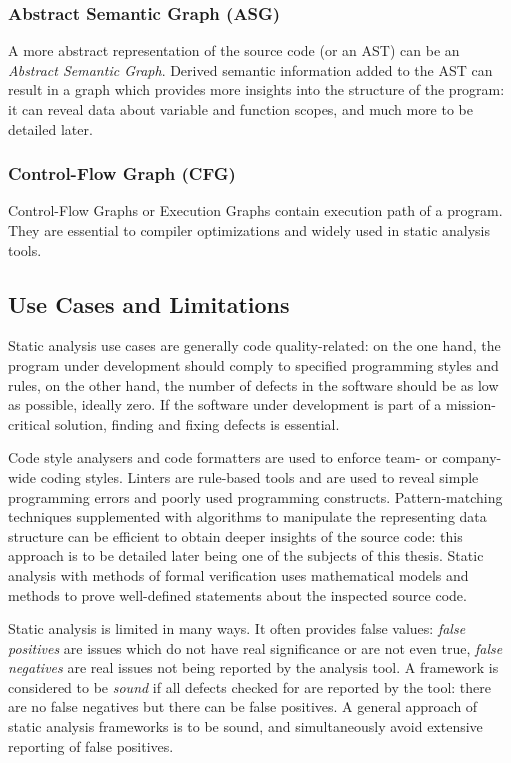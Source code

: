 \subsubsection{Abstract Semantic Graph (ASG)}

A more abstract representation of the source code (or an AST) can be an \emph{Abstract Semantic Graph}. Derived semantic information added to the AST can result in a graph which provides more insights into the structure of the program: it can reveal data about variable and function scopes, and much more to be detailed later.


\subsubsection{Control-Flow Graph (CFG)}

Control-Flow Graphs or Execution Graphs contain execution path of a program. They are essential to compiler optimizations and widely used in static analysis tools.


\subsection{Use Cases and Limitations}

Static analysis use cases are generally code quality-related: on the one hand, the program under development should comply to specified programming styles and rules, on the other hand, the number of defects in the software should be as low as possible, ideally zero. If the software under development is part of a mission-critical solution, finding and fixing defects is essential.

Code style analysers and code formatters are used to enforce team- or company-wide coding styles. Linters are rule-based tools and are used to reveal simple programming errors and poorly used programming constructs. Pattern-matching techniques supplemented with algorithms to manipulate the representing data structure can be efficient to obtain deeper insights of the source code: this approach is to be detailed later being one of the subjects of this thesis. Static analysis with methods of formal verification uses mathematical models and methods to prove well-defined statements about the inspected source code.

Static analysis is limited in many ways. It often provides false values: \emph{false positives} are issues which do not have real significance or are not even true, \emph{false negatives} are real issues not being reported by the analysis tool. A framework is considered to be \emph{sound} if all defects checked for are reported by the tool: there are no false negatives but there can be false positives. A general approach of static analysis frameworks is to be sound, and simultaneously avoid extensive reporting of false positives.~\cite{emanuelsson2008comparative}

